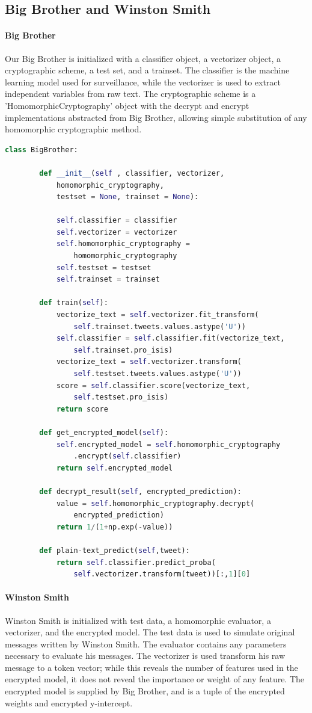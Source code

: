 \documentclass[10pt, a4paper]{article}
\begin{document}
	\subsection{Big Brother and Winston Smith}
	\paragraph{Big Brother} Our Big Brother is initialized with a classifier object, a vectorizer object, a cryptographic scheme, a test set, and a trainset. The classifier is the machine learning model used for surveillance, while the vectorizer is used to extract independent variables from raw text. The cryptographic scheme is a 'HomomorphicCryptography' object with the decrypt and encrypt implementations abstracted from Big Brother, allowing simple substitution of any homomorphic cryptographic method. 
	
	\begin{lstlisting}[language=Python,caption = Benevolent Big Brother]
	class BigBrother:
	
		def __init__(self , classifier, vectorizer, 
			homomorphic_cryptography, 
			testset = None, trainset = None):
			
			self.classifier = classifier
			self.vectorizer = vectorizer
			self.homomorphic_cryptography = 
				homomorphic_cryptography
			self.testset = testset
			self.trainset = trainset
		
		def train(self):
			vectorize_text = self.vectorizer.fit_transform(
				self.trainset.tweets.values.astype('U'))
			self.classifier = self.classifier.fit(vectorize_text, 
				self.trainset.pro_isis)
			vectorize_text = self.vectorizer.transform(
				self.testset.tweets.values.astype('U'))
			score = self.classifier.score(vectorize_text, 
				self.testset.pro_isis)
			return score
		
		def get_encrypted_model(self):
			self.encrypted_model = self.homomorphic_cryptography
				.encrypt(self.classifier)
			return self.encrypted_model
		
		def decrypt_result(self, encrypted_prediction):
			value = self.homomorphic_cryptography.decrypt(
				encrypted_prediction)
			return 1/(1+np.exp(-value))
		
		def plain-text_predict(self,tweet):
			return self.classifier.predict_proba(
				self.vectorizer.transform(tweet))[:,1][0]
	\end{lstlisting}
	
	\paragraph{Winston Smith} Winston Smith is initialized with test data, a homomorphic evaluator, a vectorizer, and the encrypted model. The test data is used to simulate original messages written by Winston Smith. The evaluator contains any parameters necessary to evaluate his messages. The vectorizer is used transform his raw message to a token vector; while this reveals the number of features used in the encrypted model, it does not reveal the importance or weight of any feature. The encrypted model is supplied by Big Brother, and is a tuple of the encrypted weights and encrypted y-intercept.
	
\end{document}
